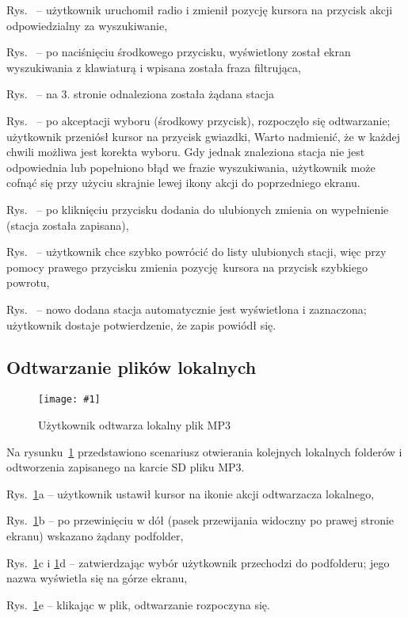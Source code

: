 \documentclass[12pt]{report}
\let\tempone\itemize
\let\temptwo\enditemize
\renewenvironment{itemize}{\tempone\setlength{\itemsep}{0cm}}{\temptwo}
\newcommand{\imgint}[4]{
	\begin{figure}[{#4}]
		\centering
		\texttt{[image: \#1]}
		\caption{#2}
		\label{#1}
	\end{figure}
}
\newcommand{\imgh}[3]{\imgint{#1}{#2}{#3}{H}}
\begin{document}
			\begin{itemize}
				\item Rys.~ -- użytkownik uruchomił radio i zmienił pozycję kursora na przycisk akcji odpowiedzialny za wyszukiwanie,
				\item Rys.~ -- po naciśnięciu środkowego przycisku, wyświetlony został ekran wyszukiwania z klawiaturą i wpisana została fraza filtrująca,
				\item Rys.~ -- na 3. stronie odnaleziona została żądana stacja
				\item Rys.~ -- po akceptacji wyboru (środkowy przycisk), rozpoczęło się odtwarzanie; użytkownik przeniósł kursor na przycisk gwiazdki,
			\end{itemize}
			Warto nadmienić, że w każdej chwili możliwa jest korekta wyboru. Gdy jednak znaleziona stacja nie jest odpowiednia lub popełniono błąd we frazie wyszukiwania, użytkownik może cofnąć się przy użyciu skrajnie lewej ikony akcji do poprzedniego ekranu.
			\begin{itemize}
				\item Rys.~ -- po kliknięciu przycisku dodania do ulubionych zmienia on wypełnienie (stacja została zapisana),
				\item Rys.~ -- użytkownik chce szybko powrócić do listy ulubionych stacji, więc przy pomocy prawego przycisku zmienia pozycję kursora na przycisk szybkiego powrotu,
				\item Rys.~ -- nowo dodana stacja automatycznie jest wyświetlona i zaznaczona; użytkownik dostaje potwierdzenie, że zapis powiódł się.
			\end{itemize}
			
		\subsection{Odtwarzanie plików lokalnych}
			\imgh{5/PicoRadio-fl-local}{Użytkownik odtwarza lokalny plik MP3}{0.9}
			\newcommand{\rflocal}[1]{\ref{5/PicoRadio-fl-local}#1}
			
			Na rysunku~\rflocal{} przedstawiono scenariusz otwierania kolejnych lokalnych folderów i odtworzenia zapisanego na karcie SD pliku MP3.
			
			\begin{itemize}
				\item Rys.~\rflocal{a} -- użytkownik ustawił kursor na ikonie akcji odtwarzacza lokalnego,
				\item Rys.~\rflocal{b} -- po przewinięciu w dół (pasek przewijania widoczny po prawej stronie ekranu) wskazano żądany podfolder,
				\item Rys.~\rflocal{c} i \rflocal{d} -- zatwierdzając wybór użytkownik przechodzi do podfolderu; jego nazwa wyświetla się na górze ekranu,
				\item Rys.~\rflocal{e} -- klikając w plik, odtwarzanie rozpoczyna się.
			\end{itemize}
			
\end{document}
